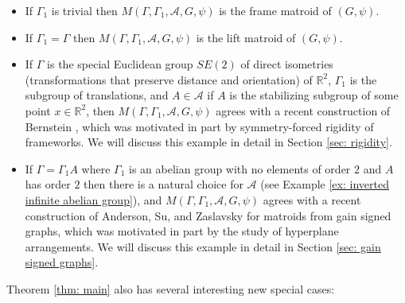 \documentclass[12pt]{article}
\theoremstyle{definition}
\newcommand{\bR}{\mathbb R}
\newcommand{\cA}{\mathcal{A}}
\begin{document}
\begin{itemize}[leftmargin=1.5em]
    \item If $\Gamma_1$ is trivial then $M(\Gamma, \Gamma_1, \cA, G, \psi)$ is the frame matroid of $(G, \psi)$.

    \item If $\Gamma_1 = \Gamma$ then $M(\Gamma, \Gamma_1, \cA, G, \psi)$ is the lift matroid of $(G, \psi)$.

    \item If $\Gamma$ is the special Euclidean group $SE(2)$ of direct isometries (transformations that preserve distance and orientation) of $\bR^2$, $\Gamma_1$ is the subgroup of translations, and $A \in \cA$ if $A$ is the stabilizing subgroup of some point $x \in \bR^2$, then $M(\Gamma, \Gamma_1, \cA, G, \psi)$ agrees with a recent construction of Bernstein \cite{Bernstein2022}, which was motivated in part by symmetry-forced rigidity of frameworks.
    We will discuss this example in detail in Section \ref{sec: rigidity}.

    \item If $\Gamma = \Gamma_1 A$ where $\Gamma_1$ is an abelian group with no elements of order $2$ and $A$ has order $2$ then there is a natural choice for $\cA$ (see Example \ref{ex: inverted infinite abelian group}), and $M(\Gamma, \Gamma_1, \cA, G, \psi)$ agrees with a recent construction of Anderson, Su, and Zaslavsky \cite{Anderson-Su-Zaslavsky2024} for matroids from gain signed graphs, which was motivated in part by the study of hyperplane arrangements. We will discuss this example in detail in Section \ref{sec: gain signed graphs}.
\end{itemize}



\noindent
Theorem \ref{thm: main} also has several interesting new special cases:
\end{document}
